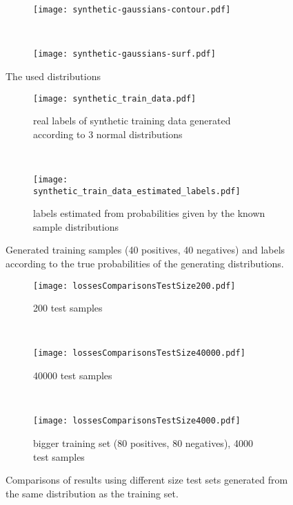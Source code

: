 \begin{figure}[ht]
	\centering
	\begin{subfigure}[h]{0.45\textwidth}
	\texttt{[image: synthetic-gaussians-contour.pdf]}	
	\end{subfigure}
	~
	\begin{subfigure}[h]{0.45\textwidth}
	\texttt{[image: synthetic-gaussians-surf.pdf]}	
	\end{subfigure}
	\caption{The used distributions}
	\label{fig:synthetic-gaussians}
\end{figure}

\begin{figure}[ht]
	\centering
	\begin{subfigure}[h]{0.45\textwidth}
	\texttt{[image: synthetic\_train\_data.pdf]}	
		\caption*{real labels of synthetic training data generated according to 3 normal distributions}
	\end{subfigure}
	~
	\begin{subfigure}[h]{0.45\textwidth}
	\texttt{[image: synthetic\_train\_data\_estimated\_labels.pdf]}	
		\caption*{labels estimated from probabilities given by the known sample distributions}
	\end{subfigure}
	\caption{Generated training samples (40 positives, 40 negatives) and labels according to the true probabilities of the generating distributions.}
	\label{fig:synthetic_train_data}
\end{figure}

\begin{figure}[ht]
	\centering
	\begin{subfigure}[h]{0.45\textwidth}
	\texttt{[image: lossesComparisonsTestSize200.pdf]}	
		\caption*{200 test samples}
	\end{subfigure}
	~
	\begin{subfigure}[h]{0.45\textwidth}
	\texttt{[image: lossesComparisonsTestSize40000.pdf]}	
		\caption*{40000 test samples}
	\end{subfigure}
	~
	\begin{subfigure}[h]{\textwidth}
	\texttt{[image: lossesComparisonsTestSize4000.pdf]}	
		\caption*{bigger training set (80 positives, 80 negatives), 4000 test samples}
	\end{subfigure}
	\caption{Comparisons of results using different size test sets generated from the same distribution as the training set. }
	\label{fig:loss-functions-comparisons}
\end{figure}

